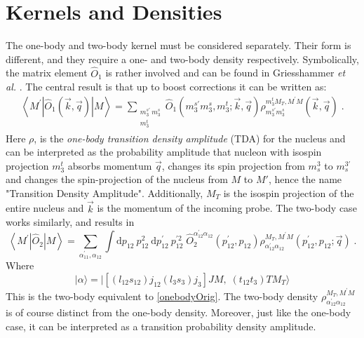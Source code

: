 \documentclass[a4paper,11pt]{article}
\newcommand{\etal}{\textit{et al.}}
\newcommand\bv[1]{\vec{#1}}
\begin{document}
\section{Kernels and Densities}
The one-body and two-body kernel must be considered separately.
Their form is different, and they require a one- and
two-body density respectively.
Symbolically, the matrix element $\hat{O}_1$ is rather involved and can be found in Griesshammer \etal 
\cite{hammer2020, hammer4He}.
The central result is that up to boost corrections it can
be written as:
\begin{align}
  \left\langle M^{\prime}\left|\hat{O}_{1}(\bv{k}, \bv{q})\right|
  M\right\rangle=\sum_{\substack{m_{3}^{s \prime}\,
  m_{3}^{s}\\m_3^t}}\hat{O}_{1}\left(m_{3}^{s \prime} m_{3}^{s},
  m_{3}^{t} ;  \bv{k}, \bv{q}\right) \rho_{m_{3}^{s \prime}
  m_{3}^{s}}^{m_3^{t} M_{T}, M^{\prime} M}(\bv{k}, \bv{q})\label{onebodyOrig}\;.
\end{align}
Here $\rho$, is the \textit{one-body transition density amplitude} (TDA)
for the nucleus and can be
interpreted as the probability amplitude that nucleon with isospin projection $m_3^t$ absorbs
momentum $\bv{q}$, changes its spin projection from $m_s^3$ to
$m_s^{3'}$ and changes the spin-projection of the nucleus from $M$ to
$M'$, hence the name "Transition Density Amplitude".
Additionally, $M_T$ is the isospin projection of the entire nucleus and $\vec{k}$ is the momentum of the incoming probe.
The two-body case works similarly, and results in
\begin{equation}
  \left\langle M^{\prime}\left|\hat{O}_{2}\right| M\right\rangle =
  \sum_{\alpha_{11}^{\prime}, \alpha_{12}} \int \mathrm{d} p_{12}\:
  p_{12}^{2} \mathrm{~d} p_{12}^{\prime}\: p_{12}^{\prime 2}\;
  \hat{O}_{2}^{\alpha_{12}^{\prime} \alpha_{12}}\left(p_{12}^{\prime},
  p_{12}\right) \rho_{\alpha_{12}^{\prime} \alpha_{12}}^{M_{T},
  M^{\prime} M}\left(p_{12}^{\prime}, p_{12} ; \bv{q}\right)\label{twobody}\;.
\end{equation}
Where 
\begin{equation}
  | \alpha \rangle =|\left[(l_{12}s_{12})j_{12}(l_3 s_3)j_3\right] JM,\;(t_{12}t_3)TM_T\rangle
\end{equation}
This is the two-body equivalent to \eqref{onebodyOrig}.
The two-body density $\rho_{\alpha_{12}^{\prime}
\alpha_{12}}^{M_{T}, M^{\prime} M}$ is of course distinct
from the one-body density.
Moreover, just like the one-body case, it can be interpreted as a
transition probability density amplitude.
\end{document}
